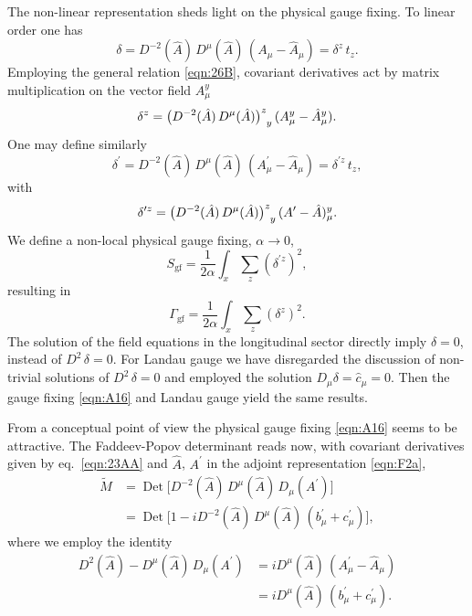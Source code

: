 \documentclass[twocolumn,aps,prd,amsmath,amssymb,preprintnumbers,longbibliography]{revtex4-1}
\numberwithin{equation}{section}
\DeclareMathOperator{\Det}{Det}
\newenvironment{alignedeqn}{\begin{equation}\begin{aligned}}{\end{aligned}\end{equation}\ignorespacesafterend}
\begin{document}
\begin{appendices}
The non-linear representation sheds light on the physical gauge fixing. To linear order one has
\begin{equation}\label{eqn:A14}
	\delta
	= D^{-2}(\hat{A}) \, D^\mu(\hat{A}) \, (A_\mu - \hat{A}_\mu)
	= \delta^z \, t_z.
\end{equation}
Employing the general relation \eqref{eqn:26B}, covariant derivatives act by matrix multiplication on the vector field $A_\mu^y$
\begin{equation}\label{eqn:190A}
	\delta^z
	= \tensor{\bigl(D^{-2}(\hat{A}) \, D^\mu(\hat{A})\bigr)}{^z_y} \, (A_\mu^y - \hat{A}_\mu^y).
\end{equation}
One may define similarly
\begin{equation}\label{eqn:A15}
	\delta^\prime
	= D^{-2}(\hat{A}) \, D^\mu(\hat{A}) \, (A_\mu^\prime - \hat{A}_\mu)
	= \delta^{\prime z} \, t_z,
\end{equation}
with
\begin{equation}\label{eqn:191A}
	\delta^{\prime z}
	= \tensor{\bigl(D^{-2}(\hat{A}) \, D^\mu(\hat{A})\bigr)}{^z_y} \, (A^\prime - \hat{A})_\mu^y.
\end{equation}
We define a non-local physical gauge fixing, $\alpha \to 0$,
\begin{equation}\label{eqn:A16}
	S_\text{gf}
	= \frac{1}{2 \alpha} \int_x \sum_z (\delta^{\prime z})^2,
\end{equation}
resulting in
\begin{equation}\label{eqn:A17}
	\Gamma_\text{gf}
	= \frac{1}{2 \alpha} \int_x \sum_z (\delta^z)^2.
\end{equation}
The solution of the field equations in the longitudinal sector directly imply $\delta = 0$, instead of $D^2 \, \delta = 0$. For Landau gauge we have disregarded the discussion of non-trivial solutions of $D^2 \, \delta = 0$ and employed the solution $D_\mu \delta = \hat{c}_\mu = 0$. Then the gauge fixing \eqref{eqn:A16} and Landau gauge yield the same results.

From a conceptual point of view the physical gauge fixing \eqref{eqn:A16} seems to be attractive. The Faddeev-Popov determinant reads now, with covariant derivatives given by eq.~\eqref{eqn:23AA} and $\hat{A}$, $A^\prime$ in the adjoint representation \eqref{eqn:F2a},
\begin{alignedeqn}\label{eqn:A18}
	\tilde{M}
	&= \Det\bigl[D^{-2}(\hat{A}) \, D^\mu(\hat{A}) \, D_\mu(A^\prime)\bigr]\\
	&= \Det\bigl[1 - i D^{-2}(\hat{A}) \, D^\mu(\hat{A}) \, (b_\mu^\prime + c_\mu^\prime)\bigr],
\end{alignedeqn}
where we employ the identity
\begin{alignedeqn}\label{eqn:214A}
	D^2(\hat{A}) - D^\mu(\hat{A}) \, D_\mu(A^\prime)
	&= i D^\mu(\hat{A}) \, (A_\mu^\prime - \hat{A}_\mu)\\
	&= i D^\mu(\hat{A}) \, (b_\mu^\prime + c_\mu^\prime).
\end{alignedeqn}


\end{appendices}
\end{document}
